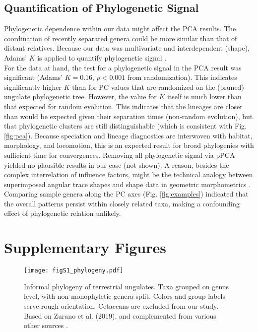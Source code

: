 \documentclass[9pt,twoside,lineno]{pnas-new}
\begin{document}
\subsection{Quantification of Phylogenetic Signal}\label{apdx:phylosig}
Phylogenetic dependence within our data might affect the PCA results. 
The coordination of recently separated genera could be more similar than that of distant relatives. 
Because our data was multivariate and interdependent (shape), Adams' $K$ is applied to quantify phylogenetic signal \cite{Adams2014}. 
\\For the data at hand, the test for a phylogenetic signal in the PCA result was significant (Adams' $K=0.16$, $p < 0.001$ from randomization). 
This indicates significantly higher $K$ than for PC values that are randomized on the (pruned) ungulate phylogenetic tree. 
However, the value for $K$ itself is much lower than that expected for random evolution. 
This indicates that the lineages are closer than would be expected given their separation times (non-random evolution), but that phylogenetic clusters are still distinguishable (which is consistent with Fig. \ref{fig:pca}). 
Because speciation and lineage diagnostics are interwoven with habitat, morphology, and locomotion, this is an expected result for broad phylogenies with sufficient time for convergences. 
Removing all phylogenetic signal via pPCA \cite{Revell2009} yielded no plausible results in our case (not shown). 
A reason, besides the complex interrelation of influence factors, might be the technical analogy between superimposed angular trace shapes and shape data in geometric morphometrics \cite[\textit{cf.}][]{Polly2013}. 
Comparing sample genera along the PC axes (Fig. \ref*{fig:examples}) indicated that the overall patterns persist within closely related taxa, making a confounding effect of phylogenetic relation unlikely. 



\newpage
\section{Supplementary Figures}

\begin{figure}[h!]
\centering
\texttt{[image: figS1\_phylogeny.pdf]}
\caption{Informal phylogeny of terrestrial ungulates. Taxa grouped on genus level, with non-monophyletic genera split. Colors and group labels serve rough orientation. Cetaceans are excluded from our study. 
Based on Zurano et al. (2019), and complemented from various other sources \cite{Zurano2019, ParisiDutra2017,Frantz2015,Ryder2011,Price2009,Gongora2011,Funk2007,Hassanin2012}.
 }
\label{fig:phylogeny}
\end{figure}
\end{document}
